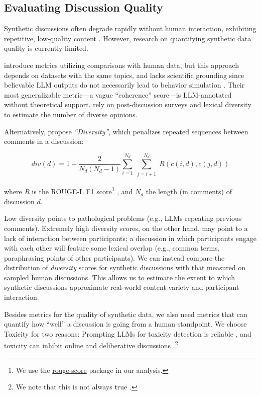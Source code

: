 \subsection{Evaluating Discussion Quality}
\label{ssec:related:quality}

Synthetic discussions often degrade rapidly without human interaction, exhibiting repetitive, low-quality content \citep{ulmer2024}. However, research on quantifying synthetic data quality is currently limited.

\citet{balog_2024} introduce metrics utilizing comparisons with human data, but this approach depends on datasets with the same topics, and lacks scientific grounding since believable \ac{LLM} outputs do not necessarily lead to behavior simulation \cite{rossi_2024}. Their most generalizable metric—a vague “coherence” score—is \ac{LLM}-annotated without theoretical support. \citet{kim_et_al_chatbot} rely on post-discussion surveys and lexical diversity to estimate the number of diverse opinions.

Alternatively, \citet{ulmer2024} propose \textit{“Diversity”}, which penalizes repeated sequences between comments in a discussion:

\small
\begin{equation}
\label{eq:variety}
    \textit{div}(d) = 1 - \frac{2}{N_d(N_d-1)}
\sum_{i=1}^{N_d} \sum_{\substack{j=i+1}}^{N_d} R(c(i,d), c(j,d))
\end{equation}
\normalsize

\noindent where \textit{R} is the ROUGE-L F1 score\footnote{We use the \href{https://pypi.org/project/rouge-score}{rouge-score} package in our analysis.} \cite{lin-2004-rouge}, and $N_d$ the length (in comments) of discussion $d$.

Low diversity points to pathological problems (e.g., \acp{LLM} repeating previous comments). Extremely high diversity scores, on the other hand, may point to a lack of interaction between participants; a discussion in which participants engage with each other will feature some lexical overlap (e.g., common terms, paraphrasing points of other participants). We can instead compare the distribution of \textit{diversity} scores for synthetic discussions with that measured on sampled human discussions. This allows us to estimate the extent to which synthetic discussions approximate real-world content variety and participant interaction.%

Besides metrics for the quality of synthetic data, we also need metrics that can quantify how ``well'' a discussion is going from a human standpoint. We choose Toxicity for two reasons: Prompting \acp{LLM} for toxicity detection is reliable \citep{kang-qian-2024-implanting, Wang2022ToxicityDW, anjum2024hate}, and toxicity can inhibit online and deliberative discussions \citep{dekock2022disagree, XiaToxicity}.\footnote{We note that this is not always true \citep{Avalle2024PersistentIP}.}


